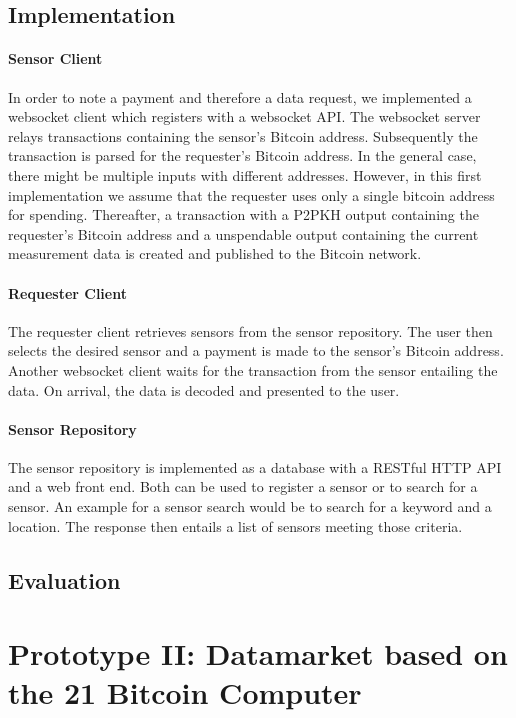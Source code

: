 \subsection{Implementation}

\paragraph{Sensor Client}
In order to note a payment and therefore a data request, we implemented a websocket
client which registers with a websocket API. The websocket server relays transactions containing
the sensor's Bitcoin address. Subsequently the transaction is parsed for the 
requester's Bitcoin address. In the general case, there might be multiple inputs
with different addresses. However, in this first implementation we assume that the
requester uses only a single bitcoin address for spending. Thereafter, a transaction
with a P2PKH output containing the requester's Bitcoin address and a
unspendable output containing the current measurement data is created and published
to the Bitcoin network. 

\paragraph{Requester Client}
The requester client retrieves sensors from the sensor repository. The user then selects the desired sensor and a payment is made to the sensor's Bitcoin address. Another websocket client waits for the transaction from the sensor entailing the data. On arrival, the data is decoded and presented to the user.

\paragraph{Sensor Repository}
The sensor repository is implemented as a database with a RESTful HTTP API and
a web front end. Both can be used to register a sensor or to search for a sensor.
An example for a sensor search would be to search for a keyword and a location.
The response then entails a list of sensors meeting those criteria.

\subsection{Evaluation}

\section{Prototype II: Datamarket based on the 21 Bitcoin Computer}

